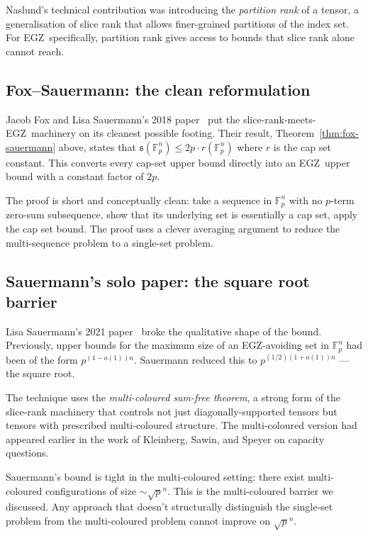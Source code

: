 \documentclass[11pt,a4paper]{article}
\theoremstyle{plain}
\theoremstyle{definition}
\theoremstyle{remark}
\newcommand{\F}{\mathbb{F}}
\newcommand{\sUFp}{\mathfrak{s}}
\newcommand{\EGZ}{\textsf{EGZ}}
\begin{document}
Naslund's technical contribution was introducing the \emph{partition rank} of a tensor, a generalisation of slice rank that allows finer-grained partitions of the index set. For \EGZ\ specifically, partition rank gives access to bounds that slice rank alone cannot reach.

\subsection{Fox--Sauermann: the clean reformulation}

Jacob Fox and Lisa Sauermann's 2018 paper~\cite{foxsauermann2018} put the slice-rank-meets-\EGZ\ machinery on its cleanest possible footing. Their result, Theorem~\ref{thm:fox-sauermann} above, states that $\sUFp(\F_p^n) \leq 2p \cdot r(\F_p^n)$ where $r$ is the cap set constant. This converts every cap-set upper bound directly into an \EGZ\ upper bound with a constant factor of $2p$.

The proof is short and conceptually clean: take a sequence in $\F_p^n$ with no $p$-term zero-sum subsequence, show that its underlying set is essentially a cap set, apply the cap set bound. The proof uses a clever averaging argument to reduce the multi-sequence problem to a single-set problem.

\subsection{Sauermann's solo paper: the square root barrier}

Lisa Sauermann's 2021 paper~\cite{sauermann2021} broke the qualitative shape of the bound. Previously, upper bounds for the maximum size of an \EGZ-avoiding set in $\F_p^n$ had been of the form $p^{(1-o(1))n}$. Sauermann reduced this to $p^{(1/2)(1+o(1))n}$ --- the square root.

The technique uses the \emph{multi-coloured sum-free theorem}, a strong form of the slice-rank machinery that controls not just diagonally-supported tensors but tensors with prescribed multi-coloured structure. The multi-coloured version had appeared earlier in the work of Kleinberg, Sawin, and Speyer on capacity questions.

Sauermann's bound is tight in the multi-coloured setting: there exist multi-coloured configurations of size $\sim \sqrt{p}^n$. This is the multi-coloured barrier we discussed. Any approach that doesn't structurally distinguish the single-set problem from the multi-coloured problem cannot improve on $\sqrt{p}^n$.
\end{document}
